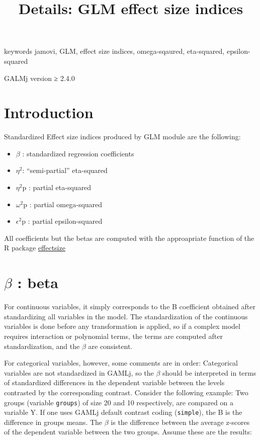 \documentclass[]{article}
\title{Details: GLM effect size indices}
\author{}
\date{\vspace{-2.5em}}
\providecommand{\tightlist}{%
  \setlength{\itemsep}{0pt}\setlength{\parskip}{0pt}}
\begin{document}
\maketitle

{
\setcounter{tocdepth}{2}
\tableofcontents
}
{ { keywords } jamovi, GLM, effect size indices, omega-sqaured,
eta-squared, epsilon-squared }

{ { GALMj version ≥ } 2.4.0 }

\hypertarget{introduction}{%
\section{Introduction}\label{introduction}}

Standardized Effect size indices produced by GLM module are the
following:

\begin{itemize}
\tightlist
\item
  \(\beta\) : standardized regression coefficients
\item
  \(\eta^2\): ``semi-partial'' eta-squared
\item
  \(\eta^2\)p : partial eta-squared
\item
  \(\omega^2\)p : partial omega-squared
\item
  \(\epsilon^2\)p : partial epsilon-squared
\end{itemize}

All coefficients but the betas are computed with the approapriate
function of the R package
\href{https://cran.r-project.org/web/packages/effectsize/index.html}{effectsize}

\hypertarget{beta-beta}{%
\section{\texorpdfstring{\(\beta\) :
beta}{\textbackslash{}beta : beta}}\label{beta-beta}}

For continuous variables, it simply corresponds to the B coefficient
obtained after standardizing all variables in the model. The
standardization of the continuous variables is done before any
transformation is applied, so if a complex model requires interaction or
polynomial terms, the terms are computed after standardization, and the
\(\beta\) are consistent.

For categorical variables, however, some comments are in order:
Categorical variables are not standardized in {GAMLj}, so the \(\beta\)
should be interpreted in terms of standardized differences in the
dependent variable between the levels contrasted by the corresponding
contrast. Consider the following example: Two groups (variable
\texttt{groups}) of size 20 and 10 respectively, are compared on a
variable Y. If one uses {GAMLj} default contrast coding
(\texttt{simple}), the B is the difference in groups means. The
\(\beta\) is the difference between the average z-scores of the
dependent variable between the two groups. Assume these are the results:
\end{document}
